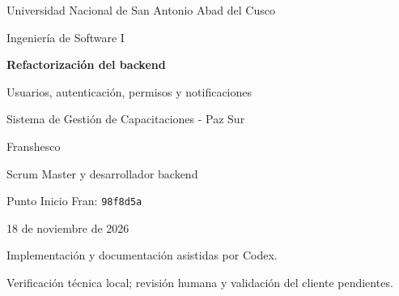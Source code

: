\documentclass[11pt,a4paper,oneside]{report}
\begin{document}
\begin{titlepage}
\centering
{\Large Universidad Nacional de San Antonio Abad del Cusco\par}
\vspace{1cm}
{\large Ingeniería de Software I\par}
\vspace{2cm}
{\Huge\bfseries Refactorización del backend\par}
\vspace{0.6cm}
{\Large Usuarios, autenticación, permisos y notificaciones\par}
\vspace{1cm}
{\large Sistema de Gestión de Capacitaciones - Paz Sur\par}
\vfill
{\Large Franshesco\par}
{\large Scrum Master y desarrollador backend\par}
\vspace{1cm}
{\large Punto Inicio Fran: \texttt{98f8d5a}\par}
\vspace{0.5cm}
18 de noviembre de 2026\par
\vspace{0.6cm}
{\small Implementación y documentación asistidas por Codex.\par
Verificación técnica local; revisión humana y validación del cliente pendientes.}
\end{titlepage}
\tableofcontents
\clearpage

\end{document}
